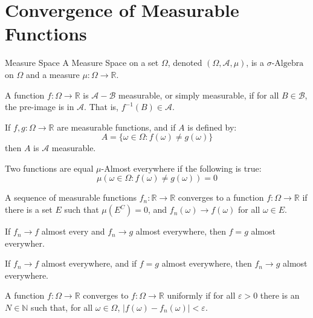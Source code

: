 \section{Convergence of Measurable Functions}
    \begin{ldefinition}{Measure Space}
        A Measure Space on a set $\Omega$, denoted
        $(\Omega,\mathcal{A},\mu)$, is a
        $\sigma\textrm{-Algebra}$ on $\Omega$ and a
        measure $\mu:\Omega\rightarrow\mathbb{R}$.
    \end{ldefinition}
    A function $f:\Omega\rightarrow\mathbb{R}$ is
    $\mathcal{A}-\mathcal{B}$ measurable, or simply
    measurable, if for all $B\in\mathcal{B}$, the
    pre-image is in $\mathcal{A}$. That is,
    $f^{-1}(B)\in\mathcal{A}$.
    \begin{theorem}
        If $f,g:\Omega\rightarrow\mathbb{R}$ are
        measurable functions, and if $A$ is defined by:
        \begin{equation}
            A=\{\omega\in\Omega:f(\omega)\ne{g}(\omega)\}
        \end{equation}
        then $A$ is $\mathcal{A}$ measurable.
    \end{theorem}
    \begin{definition}
        Two functions are equal $\mu$-Almost everywhere
        if the following is true:
        \begin{equation}
            \mu(\omega\in\Omega:f(\omega)\ne{g}(\omega))
            =0
        \end{equation}
    \end{definition}
    \begin{definition}
        A sequence of measurable functions
        $f_{n}:\mathbb{R}\rightarrow\mathbb{R}$ converges
        to a function $f:\Omega\rightarrow\mathbb{R}$
        if there is a set $E$ such that $\mu(E^{C})=0$,
        and $f_{n}(\omega)\rightarrow{f}(\omega)$ for all
        $\omega\in{E}$.
    \end{definition}
    \begin{theorem}
        If $f_{n}\rightarrow{f}$ almost every and
        $f_{n}\rightarrow{g}$ almost everywhere, then
        $f=g$ almost everywher.
    \end{theorem}
    \begin{theorem}
        If $f_{n}\rightarrow{f}$ almost everywhere, and
        if $f=g$ almost everywhere, then
        $f_{n}\rightarrow{g}$ almost everywhere.
    \end{theorem}
    \begin{definition}
        A function $f:\Omega\rightarrow\mathbb{R}$
        converges to $f:\Omega\rightarrow\mathbb{R}$
        uniformly if for all $\varepsilon>0$ there is
        an $N\in\mathbb{N}$ such that, for all
        $\omega\in\Omega$,
        $|f(\omega)-f_{n}(\omega)|<\varepsilon$.
    \end{definition}
